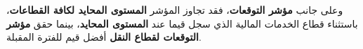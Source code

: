 وعلى جانب \textbf{مؤشر التوقعات}، فقد تجاوز المؤشر \textbf{المستوى المحايد لكافة القطاعات}، باستثناء قطاع الخدمات المالية الذي سجل قيما عند \textbf{المستوى المحايد}، بينما حقق \textbf{مؤشر التوقعات لقطاع النقل} أفضل قيم للفترة المقبلة.
